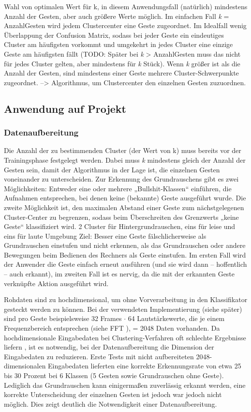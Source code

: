 Wahl von optimalen Wert für k, in diesem Anwendungsfall (natürlich) mindestens Anzahl der Gesten, aber auch größere Werte möglich. Im einfachen Fall \emph{k} = AnzahlGesten wird jedem Clustercenter eine Geste zugeordnet. Im Idealfall wenig Überlappung der Confusion Matrix, sodass bei jeder Geste ein eindeutiges Cluster am häufigsten vorkommt und umgekehrt in jedes Cluster eine einzige Geste am häufigsten fällt (TODO: Später bei\emph{ k }> AnzahlGesten muss das nicht für jedes Cluster gelten, aber mindestens für\emph{ k }Stück). Wenn\emph{ k }größer ist als die Anzahl der Gesten, sind mindestens einer Geste mehrere Cluster-Schwerpunkte zugeordnet. --> Algorithmus, um Clustercenter den einzelnen Gesten zuzuordnen. 

\subsection{Anwendung auf Projekt}


\subsubsection{Datenaufbereitung}
Die Anzahl der zu bestimmenden Cluster (der Wert von k) muss bereits vor der Trainingsphase festgelegt werden. Dabei muss\emph{ k }mindestens gleich der Anzahl der Gesten sein, damit der Algorithmus in der Lage ist, die einzelnen Gesten voneinander zu unterscheiden. Zur Erkennung des Grundrauschens gibt es zwei Möglichkeiten: Entweder eine oder mehrere „Bullshit-Klassen“ einführen, die Aufnahmen entsprechen, bei denen keine (bekannte) Geste ausgeführt wurde. Die zweite Möglichkeit ist, den maximalen Abstand einer Geste zum nächstgelegenen Cluster-Center zu begrenzen, sodass beim Überschreiten des Grenzwerts „keine Geste“ klassifiziert wird.
2 Cluster für Hintergrundrauschen, eins für leise und eins für laute Umgebung
Ziel: Besser eine Geste fälschlicherweise als Grundrauschen einstufen und nicht erkennen, als das Grundrauschen oder andere Bewegungen beim Bedienen des Rechners als Geste einstufen. Im ersten Fall wird der Anwender die Geste einfach erneut ausführen (und sie wird dann – hoffentlich – auch erkannt), im zweiten Fall ist es nervig, da die mit der erkannten Geste verknüpfte Aktion ausgeführt wird. 

Rohdaten sind zu hochdimensional, um ohne Vorverarbeitung in den Klassifikator gesteckt werden zu können. Bei der verwendeten Implementierung (siehe später) sind pro Geste beispielsweise 32 Frames $\cdot$ 64 Lautstärkewerte, die je einem Frequenzbereich entsprechen (siehe FFT \cite{fftMathebuch}), = 2048 Daten vorhanden. Da hochdimensionale Eingabedaten bei Clustering-Verfahren oft schlechte Ergebnisse liefern \cite{kMeansHighDimensions}, ist es notwendig, bei der Datenaufbereitung die Dimension der Eingabedaten zu reduzieren. Erste Tests mit nicht aufbereiteten 2048-dimensionalen Eingabedaten lieferten eine korrekte Erkennungsrate von etwa 25 bis 30 Prozent bei 6 Klassen (5 Gesten sowie Grundrauschen ohne Geste). Lediglich das Grundrauschen kann einigermaßen zuverlässig erkannt werden, eine korrekte Unterscheidung der einzelnen Gesten ist jedoch war jedoch nicht möglich. Dies zeigt deutlich die Notwendigkeit einer Datenaufbereitung.


